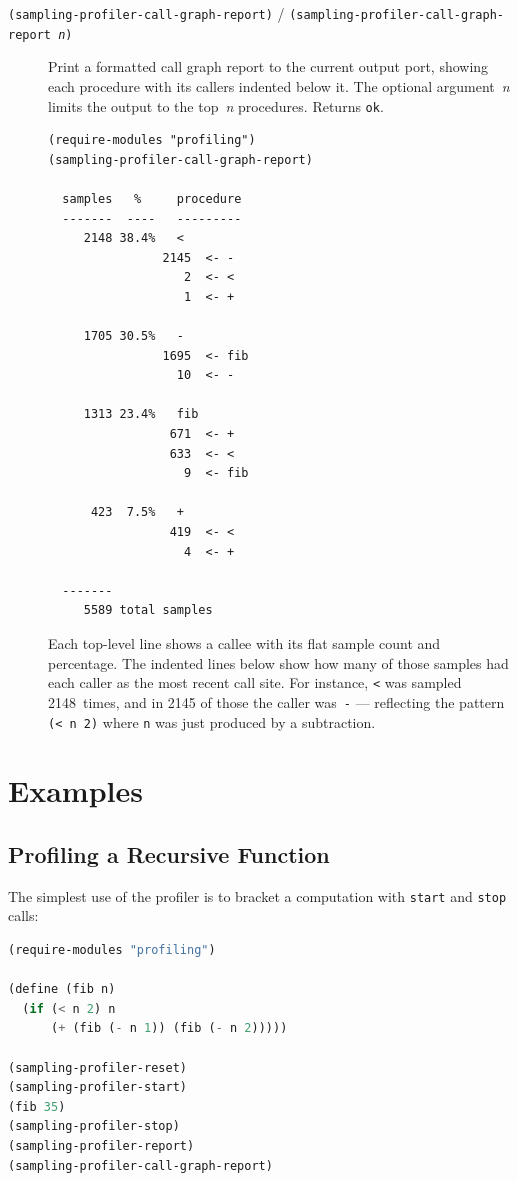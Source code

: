 \begin{description}

\item[{\tt (sampling-profiler-call-graph-report)} / {\tt (sampling-profiler-call-graph-report {\it n})}]
  Print a formatted call graph report to the current output port,
  showing each procedure with its callers indented below it.
  The optional argument~{\it n\/} limits the output to the
  top~{\it n\/} procedures.  Returns {\tt ok}.

\begin{lstlisting}[language={}]
(require-modules "profiling")
(sampling-profiler-call-graph-report)

  samples   %     procedure
  -------  ----   ---------
     2148 38.4%   <
                2145  <- -
                   2  <- <
                   1  <- +

     1705 30.5%   -
                1695  <- fib
                  10  <- -

     1313 23.4%   fib
                 671  <- +
                 633  <- <
                   9  <- fib

      423  7.5%   +
                 419  <- <
                   4  <- +

  -------
     5589 total samples
\end{lstlisting}

  Each top-level line shows a callee with its flat sample count and
  percentage.  The indented lines below show how many of those samples
  had each caller as the most recent call site.  For instance, {\tt <}
  was sampled 2148~times, and in 2145 of those the caller was~{\tt -}
  --- reflecting the pattern {\tt (< n 2)} where {\tt n} was just
  produced by a subtraction.

\end{description}


\section{Examples}

\subsection{Profiling a Recursive Function}

The simplest use of the profiler is to bracket a computation with
{\tt start} and {\tt stop} calls:

\begin{lstlisting}[language=Scheme]
(require-modules "profiling")

(define (fib n)
  (if (< n 2) n
      (+ (fib (- n 1)) (fib (- n 2)))))

(sampling-profiler-reset)
(sampling-profiler-start)
(fib 35)
(sampling-profiler-stop)
(sampling-profiler-report)
(sampling-profiler-call-graph-report)
\end{lstlisting}

